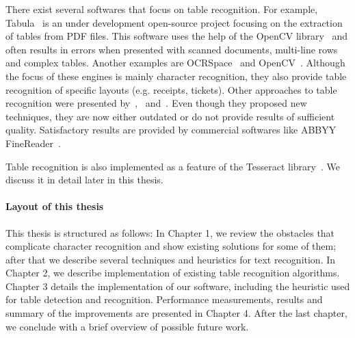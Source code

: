 There exist several softwares that focus on table recognition. For example, Tabula~\cite{Tabula} is an under development open-source project focusing on the extraction of tables from PDF files. This software uses the help of the OpenCV library~\cite{OpenCV} and often results in errors when presented with scanned documents, multi-line rows and complex tables. Another examples are OCRSpace~\cite{OCRSpace} and OpenCV~\cite{OpenCV}. Although the focus of these engines is mainly character recognition, they also provide table recognition of specific layouts (e.g. receipts, tickets). Other approaches to table recognition were presented by~\citet{pdf2table},~\citet{TRecs} and~\citet{MediumTable}. Even though they proposed new techniques, they are now either outdated or do not provide results of sufficient quality. Satisfactory results are provided by commercial softwares like ABBYY FineReader~\cite{ABBYYdpi}.

Table recognition is also implemented as a feature of the Tesseract library~\cite{tableDetHeterogeneous}. We  discuss it in detail later in this thesis.

\paragraph{Layout of this thesis} This thesis is structured as follows: In Chapter 1, we review the obstacles that complicate character recognition and show existing solutions for some of them; after that we describe several techniques and heuristics for text recognition. In Chapter 2, we describe implementation of existing table recognition algorithms. Chapter 3 details the implementation of our software, including the heuristic used for table detection and recognition. Performance measurements, results and summary of the improvements are presented in Chapter 4. After the last chapter, we conclude with a brief overview of possible future work.
